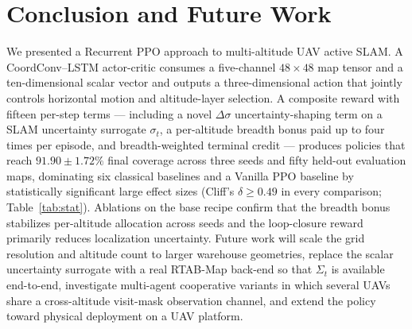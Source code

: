 \documentclass[conference]{IEEEtran}
\begin{document}
\section{Conclusion and Future Work}

We presented a Recurrent PPO approach to multi-altitude UAV active SLAM. A CoordConv--LSTM actor-critic consumes a five-channel $48{\times}48$ map tensor and a ten-dimensional scalar vector and outputs a three-dimensional action that jointly controls horizontal motion and altitude-layer selection. A composite reward with fifteen per-step terms --- including a novel $\Delta\sigma$ uncertainty-shaping term on a SLAM uncertainty surrogate $\sigma_t$, a per-altitude breadth bonus paid up to four times per episode, and breadth-weighted terminal credit --- produces policies that reach $91.90 \pm 1.72\%$ final coverage across three seeds and fifty held-out evaluation maps, dominating six classical baselines and a Vanilla PPO baseline by statistically significant large effect sizes (Cliff's $\delta\!\geq\!0.49$ in every comparison; Table~\ref{tab:stat}). Ablations on the base recipe confirm that the breadth bonus stabilizes per-altitude allocation across seeds and the loop-closure reward primarily reduces localization uncertainty. Future work will scale the grid resolution and altitude count to larger warehouse geometries, replace the scalar uncertainty surrogate with a real RTAB-Map back-end so that $\Sigma_t$ is available end-to-end, investigate multi-agent cooperative variants in which several UAVs share a cross-altitude visit-mask observation channel, and extend the policy toward physical deployment on a UAV platform.

\balance


\end{document}
